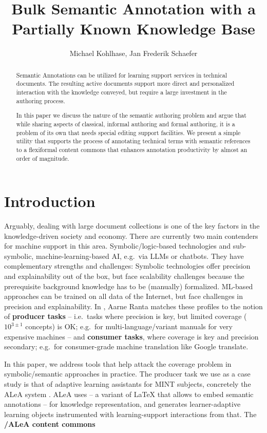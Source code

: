 \documentclass{llncs}
\title{Bulk Semantic Annotation with a Partially Known Knowledge Base}
\author{Michael Kohlhase, Jan Frederik Schaefer}
\institute{Computer Science, FAU Erlangen N\"urnberg, Germany}
\newcommand\ALeA{\textsf{ALeA}\xspace}
\begin{document}
\maketitle
\begin{abstract}
  Semantic Annotations can be utilized for learning support services in technical
  documents. The resulting active documents support more direct and personalized
  interaction with the knowledge conveyed, but require a large investment in the authoring
  process.

  In this paper we discuss the nature of the semantic authoring problem and argue that
  while sharing aspects of classical, informal authoring and formal authoring, it is a
  problem of its own that needs special editing support facilities. We present a simple
  utility that supports the process of annotating technical terms with semantic references
  to a flexiformal content commons that enhances annotation productivity by almost an
  order of magnitude.
\end{abstract}

\section{Introduction}
Arguably, dealing with large document collections is one of the key factors in the
knowledge-driven society and economy. There are currently two main contenders for machine
support in this area. Symbolic/logic-based technologies and sub-symbolic,
machine-learning-based AI, e.g.\ via LLMs or chatbots. They have complementary strengths
and challenges: Symbolic technologies offer precision and explainability out of the box,
but face scalability challenges because the prerequisite background knowledge has to be
(manually) formalized. ML-based approaches can be trained on all data of the Internet, but
face challenges in precision and explainability. In \cite{Ranta:atcp17},
Aarne Ranta matches these profiles to the notion of \textbf{producer tasks} -- i.e.\ tasks
where precision is key, but limited coverage ($10^{3\pm1}$ concepts) is OK;
e.g.\ for multi-language/variant manuals for very
expensive machines -- and \textbf{consumer tasks}, where coverage is key and
precision secondary; e.g.\ for consumer-grade machine translation like \textsf{Google translate}.

In this paper, we address tools that help attack the coverage problem in symbolic/semantic
approaches in practice. The producer task we use as a case study is that of adaptive
learning assistants for MINT subjects, concretely the \ALeA system \cite{BerBetChu:lssmkm23}.
\ALeA uses \sTeX \cite{MueKo:sdstex22,sTeX:github:on} -- a
variant of {\LaTeX} that allows to embed semantic annotations -- for knowledge
representation, and generates learner-adaptive learning objects instrumented with
learning-support interactions from that. The \textbf{\sTeX/\ALeA content commons}
\end{document}
